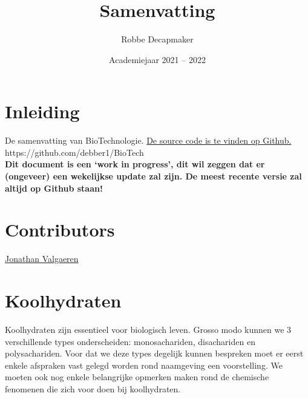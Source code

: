 \documentclass[a4paper,kul]{kulakarticle} %
\date{Academiejaar 2021 -- 2022}
\title{Samenvatting}
\author{Robbe Decapmaker}
\begin{document}
\maketitle

\section*{Inleiding}

De samenvatting van BioTechnologie. \href{https://github.com/debber1/BioTech}{De source code is te vinden op Github.}\\
https://github.com/debber1/BioTech\\
\textbf{Dit document is een `work in progress', dit wil zeggen dat er (ongeveer) een wekelijkse update zal zijn. De meest recente versie zal altijd op Github staan!}
\section*{Contributors}
\href{https://github.com/ItsAlphie}{Jonathan Valgaeren}
\tableofcontents
\newpage
\section{Koolhydraten}
Koolhydraten zijn essentieel voor biologisch leven. Grosso modo kunnen we 3 verschillende types onderscheiden: monosachariden, disachariden en polysachariden. Voor dat we deze types degelijk kunnen bespreken moet er eerst enkele afspraken vast gelegd worden rond naamgeving een voorstelling. We moeten ook nog enkele belangrijke opmerken maken rond de chemische fenomenen die zich voor doen bij koolhydraten. 
\end{document}
